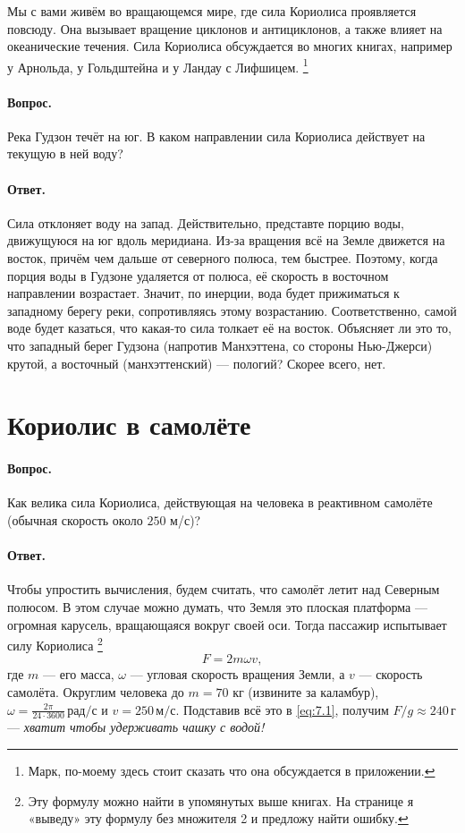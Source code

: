 Мы с вами живём во вращающемся мире, где сила Кориолиса проявляется повсюду.
Она вызывает вращение циклонов и антициклонов, а также влияет на океанические течения.
Сила Кориолиса обсуждается во многих книгах, например у \label{Арнольд-Лифшиц} Арнольда, у Гольдштейна и у Ландау с Лифшицем.%
\footnote{Марк, по-моему здесь стоит сказать что она обсуждается в приложении.}

\paragraph{Вопрос.}\label{Гудзон}
Река Гудзон течёт на юг.
В каком направлении сила Кориолиса действует на текущую в ней воду?

\paragraph{Ответ.}
Сила отклоняет воду на запад.
Действительно, представте порцию воды, движущуюся на юг вдоль меридиана.
Из-за вращения всё на Земле движется на восток, причём чем дальше от северного полюса, тем быстрее.
Поэтому, когда порция воды в Гудзоне удаляется от полюса, её скорость в восточном направлении возрастает.
Значит, по инерции, вода будет прижиматься к западному берегу реки,
сопротивляясь этому возрастанию.
Соответственно, самой воде будет казаться, что какая-то сила толкает её на восток.
Объясняет ли это то, что западный берег Гудзона (напротив Манхэттена, со стороны Нью-Джерси) крутой, а восточный (манхэттенский) --- пологий?
Скорее всего, нет.

\section{Кориолис в самолёте}\label{Кориолис в самолёте}

\paragraph{Вопрос.}
Как велика сила Кориолиса, действующая на человека в реактивном самолёте (обычная скорость около $250$ м/с)?

\paragraph{Ответ.}
Чтобы упростить вычисления, будем считать, что самолёт летит над Северным полюсом.
В этом случае можно думать, что Земля это плоская платформа --- огромная карусель, вращающаяся вокруг своей оси.
Тогда пассажир испытывает силу Кориолиса%
\footnote{Эту формулу можно найти в упомянутых выше книгах. На странице \pageref{Парадокс с Кориолисом} я «выведу» эту формулу без множителя 2 и предложу найти ошибку.}
\begin{equation}
F=2 m \omega v,
\label{eq:7.1}
\end{equation}
где $m$ --- его масса,
$\omega$ --- угловая скорость вращения Земли,
а $v$ --- скорость самолёта.
Округлим человека до $m=70$ кг (извините за каламбур),
$\omega=\tfrac{2\pi}{24 \cdot 3600}\,\text{рад/с}$ и
$v=250 \,\text{м/с}$.
Подставив всё это в \eqref{eq:7.1}, получим
$F/g \approx 240 \,\text{г}$ --- \emph{хватит чтобы удерживать чашку с водой!}

